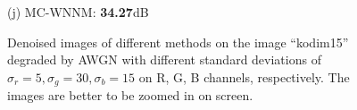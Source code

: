 \documentclass[10pt,onecolumn,letterpaper]{article}
\begin{document}
\begin{figure}[!htbp]
{\begin{minipage}[t]{0.25\textwidth}
{\footnotesize (j) MC-WNNM: \textbf{34.27}dB}
\end{minipage}
}
\caption{Denoised images of different methods on the image ``kodim15'' degraded by AWGN with different standard deviations of $\sigma_{r}=5, \sigma_{g}=30, \sigma_{b}=15$ on R, G, B channels, respectively. The images are better to be zoomed in on screen.}
\label{f6}
\end{figure}



\begin{figure}[!htbp]
\centering
\vspace{-2mm}
\vspace{-4mm}
\end{figure}
\end{document}
